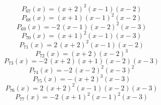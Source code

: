 \subitem \begin{dmath*}P_{67}(x) = {\left(x + 2\right)}^{2} {\left(x - 1\right)} {\left(x - 2\right)} \end{dmath*}\vspace{-1.2cm}
\subitem \begin{dmath*}P_{68}(x) = {\left(x + 1\right)} {\left(x - 1\right)}^{2} {\left(x - 2\right)} \end{dmath*}\vspace{-1.2cm}
\subitem \begin{dmath*}P_{69}(x) = -2 \, {\left(x - 1\right)} {\left(x - 2\right)}^{2} {\left(x - 3\right)} \end{dmath*}\vspace{-1.2cm}
\subitem \begin{dmath*}P_{70}(x) = {\left(x + 1\right)}^{2} {\left(x - 1\right)} {\left(x - 3\right)} \end{dmath*}\vspace{-1.2cm}
\subitem \begin{dmath*}P_{71}(x) = 2 \, {\left(x + 2\right)}^{2} {\left(x - 1\right)} {\left(x - 2\right)} \end{dmath*}\vspace{-1.2cm}
\subitem \begin{dmath*}P_{72}(x) = {\left(x + 2\right)} {\left(x - 2\right)}^{3} \end{dmath*}\vspace{-1.2cm}
\subitem \begin{dmath*}P_{73}(x) = -2 \, {\left(x + 2\right)} {\left(x + 1\right)} {\left(x - 2\right)} {\left(x - 3\right)} \end{dmath*}\vspace{-1.2cm}
\subitem \begin{dmath*}P_{74}(x) = -2 \, {\left(x - 2\right)}^{2} {\left(x - 3\right)}^{2} \end{dmath*}\vspace{-1.2cm}
\subitem \begin{dmath*}P_{75}(x) = -{\left(x + 2\right)}^{3} {\left(x - 3\right)} \end{dmath*}\vspace{-1.2cm}
\subitem \begin{dmath*}P_{76}(x) = 2 \, {\left(x + 2\right)}^{2} {\left(x - 1\right)} {\left(x - 2\right)} {\left(x - 3\right)} \end{dmath*}\vspace{-1.2cm}
\subitem \begin{dmath*}P_{77}(x) = -2 \, {\left(x + 1\right)}^{2} {\left(x - 1\right)}^{2} {\left(x - 3\right)} \end{dmath*}\vspace{-1.2cm}
